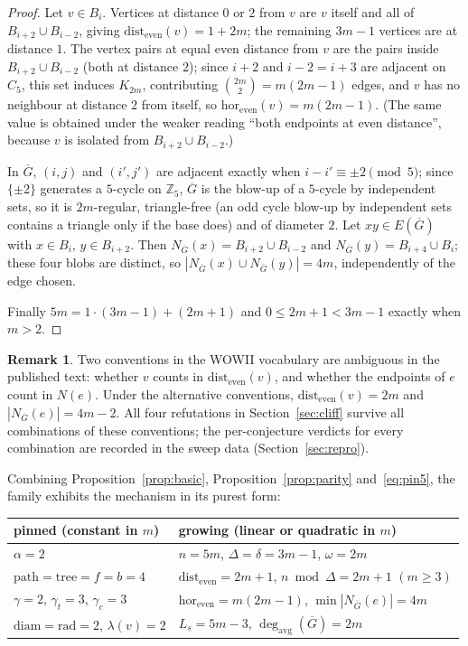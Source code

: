 \documentclass[10pt,a4paper]{article}
\theoremstyle{plain}
\theoremstyle{definition}
\newtheorem{remark}[theorem]{Remark}
\newcommand{\ZZ}{\mathbb{Z}}
\newcommand{\ind}{\alpha}
\newcommand{\forestnum}{f}
\newcommand{\bipnum}{b}
\newcommand{\treenum}{\mathrm{tree}}
\newcommand{\pathnum}{\mathrm{path}}
\newcommand{\de}{\mathrm{dist_{even}}}
\newcommand{\eh}{\mathrm{hor_{even}}}
\newcommand{\gt}{\gamma_t}
\newcommand{\gc}{\gamma_c}
\newcommand{\Ls}{L_s}
\begin{document}
\begin{proof}
Let $v \in B_i$. Vertices at distance $0$ or $2$ from $v$ are $v$ itself and all of
$B_{i+2} \cup B_{i-2}$, giving $\de(v) = 1 + 2m$; the remaining $3m-1$ vertices are at distance
$1$. The vertex pairs at equal even distance from $v$ are the pairs inside
$B_{i+2} \cup B_{i-2}$ (both at distance $2$); since $i+2$ and $i-2 = i+3$ are adjacent on
$C_5$, this set induces $K_{2m}$, contributing $\binom{2m}{2} = m(2m-1)$ edges, and $v$ has no
neighbour at distance $2$ from itself, so $\eh(v) = m(2m-1)$. (The same value is obtained under
the weaker reading ``both endpoints at even distance'', because $v$ is isolated from
$B_{i+2} \cup B_{i-2}$.)

In $\overline{G}$, $(i,j)$ and $(i',j')$ are adjacent exactly when $i - i' \equiv \pm 2
\pmod 5$; since $\{\pm 2\}$ generates a $5$-cycle on $\ZZ_5$, $\overline{G}$ is the blow-up of a
$5$-cycle by independent sets, so it is $2m$-regular, triangle-free (an odd cycle blow-up by
independent sets contains a triangle only if the base does) and of diameter $2$. Let
$xy \in E(\overline{G})$ with $x \in B_i$, $y \in B_{i+2}$. Then
$N_{\overline{G}}(x) = B_{i+2} \cup B_{i-2}$ and
$N_{\overline{G}}(y) = B_{i+4} \cup B_{i}$; these four blobs are distinct, so
$|N_{\overline{G}}(x) \cup N_{\overline{G}}(y)| = 4m$, independently of the edge chosen.

Finally $5m = 1 \cdot (3m-1) + (2m+1)$ and $0 \le 2m+1 < 3m-1$ exactly when $m > 2$.
\end{proof}

\begin{remark}\label{rem:conventions}
Two conventions in the WOWII vocabulary are ambiguous in the published text: whether $v$ counts
in $\de(v)$, and whether the endpoints of $e$ count in $N(e)$. Under the alternative
conventions, $\de(v) = 2m$ and $|N_{\overline{G}}(e)| = 4m - 2$. All four refutations in
Section~\ref{sec:cliff} survive all combinations of these conventions; the per-conjecture
verdicts for every combination are recorded in the sweep data
(Section~\ref{sec:repro}).
\end{remark}

Combining Proposition~\ref{prop:basic}, Proposition~\ref{prop:parity} and~\eqref{eq:pin5}, the
family exhibits the mechanism in its purest form:
\begin{center}
\begin{tabular}{ll}
\toprule
\textbf{pinned (constant in $m$)} & \textbf{growing (linear or quadratic in $m$)}\\
\midrule
$\ind = 2$ & $n = 5m$, \quad $\Delta = \delta = 3m-1$, \quad $\omega = 2m$\\
$\pathnum = \treenum = \forestnum = \bipnum = 4$ & $\de = 2m+1$, \quad $n \bmod \Delta = 2m+1$ $(m \ge 3)$\\
$\gamma = 2$, \; $\gt = 3$, \; $\gc = 3$ & $\eh = m(2m-1)$, \quad $\min|N_{\overline G}(e)| = 4m$\\
$\mathrm{diam} = \mathrm{rad} = 2$, \; $\lambda(v) = 2$ & $\Ls = 5m-3$, \quad $\deg_{\mathrm{avg}}(\overline{G}) = 2m$\\
\bottomrule
\end{tabular}
\end{center}
\end{document}
